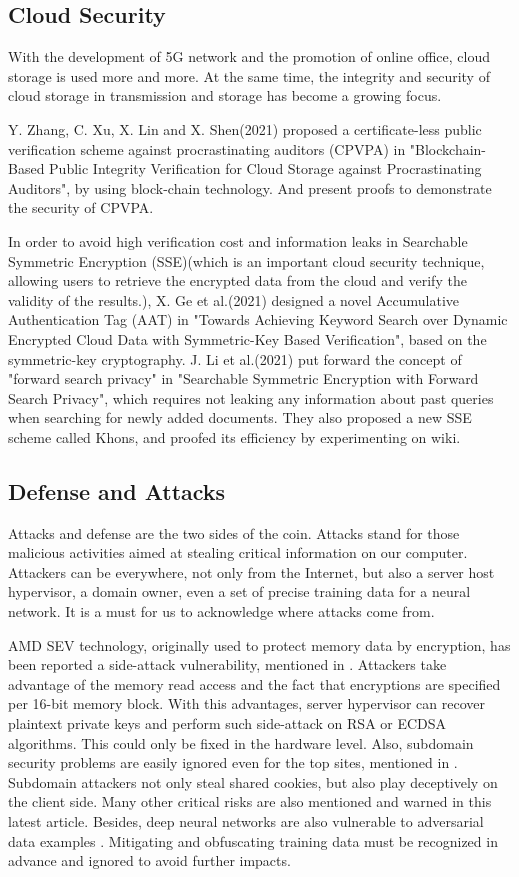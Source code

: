\documentclass[conference]{IEEEtran}
\begin{document}
\subsection{Cloud Security}
With the development of 5G network and the promotion of online office, cloud storage is used more and more. At the same time, the integrity and security of cloud storage in transmission and storage has become a growing focus.

Y. Zhang, C. Xu, X. Lin and X. Shen(2021) proposed a certificate-less public verification scheme against procrastinating auditors (CPVPA) in "Blockchain-Based Public Integrity Verification for Cloud Storage against Procrastinating Auditors"\cite{LPH-1}, by using block-chain technology. And present proofs to demonstrate the security of CPVPA.

In order to avoid high verification cost and information leaks in Searchable Symmetric Encryption (SSE)(which is an important cloud security technique, allowing users to retrieve the encrypted data from the cloud and verify the validity of the results.), X. Ge et al.(2021) designed a novel Accumulative Authentication Tag (AAT) in "Towards Achieving Keyword Search over Dynamic Encrypted Cloud Data with Symmetric-Key Based Verification"\cite{LPH-2}, based on the symmetric-key cryptography. J. Li et al.(2021) put forward the concept of "forward search privacy" in "Searchable Symmetric Encryption with Forward Search Privacy"\cite{LPH-3}, which requires not leaking any information about past queries when searching for newly added documents. They also proposed a new SSE scheme called Khons, and proofed its efficiency by experimenting on wiki.
\subsection{Defense and Attacks}
Attacks and defense are the two sides of the coin. Attacks stand for those malicious activities aimed at stealing critical information on our computer. Attackers can be everywhere, not only from the Internet, but also a server host hypervisor, a domain owner, even a set of precise training data for a neural network. It is a must for us to acknowledge where attacks come from.

AMD SEV technology, originally used to protect memory data by encryption, has been reported a side-attack vulnerability, mentioned in \cite{usenix:li}. Attackers take advantage of the memory read access and the fact that encryptions are specified per 16-bit memory block. With this advantages, server hypervisor can recover plaintext private keys and perform such side-attack on RSA or ECDSA algorithms. This could only be fixed in the hardware level. Also, subdomain security problems are easily ignored even for the top sites, mentioned in \cite{usenix:squarcina}. Subdomain attackers not only steal shared cookies, but also play deceptively on the client side. Many other critical risks are also mentioned and warned in this latest article. Besides, deep neural networks are also vulnerable to adversarial data examples \cite{acm:honeypot}. Mitigating and obfuscating training data must be recognized in advance and ignored to avoid further impacts. 
\end{document}
